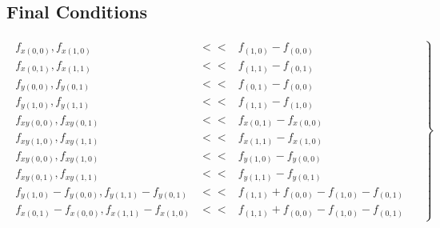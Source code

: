 \documentclass[10pt]{article}
\begin{document}
\subsection*{Final Conditions}


\begin{eqnarray}
\left.
\begin{aligned}
f_{x(0, 0)}, f_{x(1, 0)} & << &  f_{(1, 0)} - f_{(0, 0)} \\
f_{x(0, 1)}, f_{x(1, 1)} & << &  f_{(1, 1)} - f_{(0, 1)} \\
f_{y(0, 0)}, f_{y(0, 1)} & << &  f_{(0, 1)} - f_{(0, 0)} \\
f_{y(1, 0)}, f_{y(1, 1)} & << &  f_{(1, 1)} - f_{(1, 0)} \\
f_{xy(0, 0)}, f_{xy(0, 1)} & << &  f_{x(0, 1)} - f_{x(0, 0)} \\
f_{xy(1, 0)}, f_{xy(1, 1)} & << &  f_{x(1, 1)} - f_{x(1, 0)} \\
f_{xy(0, 0)}, f_{xy(1, 0)} & << &  f_{y(1, 0)} - f_{y(0, 0)} \\
f_{xy(0, 1)}, f_{xy(1, 1)} & << &  f_{y(1, 1)} - f_{y(0, 1)} \\
f_{y(1, 0)} - f_{y(0, 0)}, f_{y(1, 1)} - f_{y(0, 1)} & << &  f_{(1, 1)} + f_{(0, 0)} - f_{(1, 0)} - f_{(0, 1)} \\
f_{x(0, 1)} - f_{x(0, 0)}, f_{x(1, 1)} - f_{x(1, 0)} & << &  f_{(1, 1)} + f_{(0, 0)} - f_{(1, 0)} - f_{(0, 1)} 
\end{aligned}
\ \ \ \ \ \ \right\}
\end{eqnarray}

\end{document}
